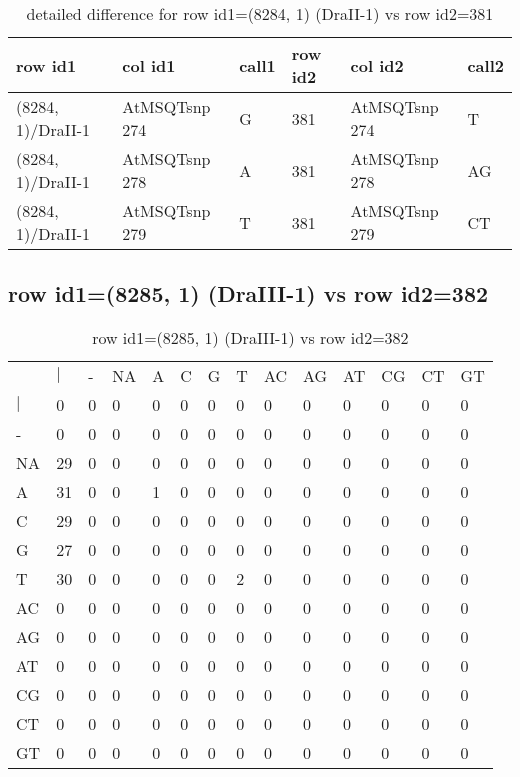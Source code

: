 \begin{center}
\begin{longtable}{|l|l|l|l|l|l|}
\caption{detailed difference for row id1=(8284, 1) (DraII-1) vs row id2=381} \label{table_dm255}\\
\hline
row id1&col id1&call1&row id2&col id2&call2\\
\hline
(8284, 1)/DraII-1&AtMSQTsnp 274&G&381&AtMSQTsnp 274&T\\
(8284, 1)/DraII-1&AtMSQTsnp 278&A&381&AtMSQTsnp 278&AG\\
(8284, 1)/DraII-1&AtMSQTsnp 279&T&381&AtMSQTsnp 279&CT\\
\hline
\end{longtable}
\end{center}

\subsection{row id1=(8285, 1) (DraIII-1) vs row id2=382}
\begin{center}
\begin{longtable}{|l|l|l|l|l|l|l|l|l|l|l|l|l|l|}
\caption{row id1=(8285, 1) (DraIII-1) vs row id2=382} \label{table_dm256}\\
\hline
\\
\hline
&$|$&-&NA&A&C&G&T&AC&AG&AT&CG&CT&GT\\
$|$&0&0&0&0&0&0&0&0&0&0&0&0&0\\
-&0&0&0&0&0&0&0&0&0&0&0&0&0\\
NA&29&0&0&0&0&0&0&0&0&0&0&0&0\\
A&31&0&0&1&0&0&0&0&0&0&0&0&0\\
C&29&0&0&0&0&0&0&0&0&0&0&0&0\\
G&27&0&0&0&0&0&0&0&0&0&0&0&0\\
T&30&0&0&0&0&0&2&0&0&0&0&0&0\\
AC&0&0&0&0&0&0&0&0&0&0&0&0&0\\
AG&0&0&0&0&0&0&0&0&0&0&0&0&0\\
AT&0&0&0&0&0&0&0&0&0&0&0&0&0\\
CG&0&0&0&0&0&0&0&0&0&0&0&0&0\\
CT&0&0&0&0&0&0&0&0&0&0&0&0&0\\
GT&0&0&0&0&0&0&0&0&0&0&0&0&0\\
\hline
\end{longtable}
\end{center}

